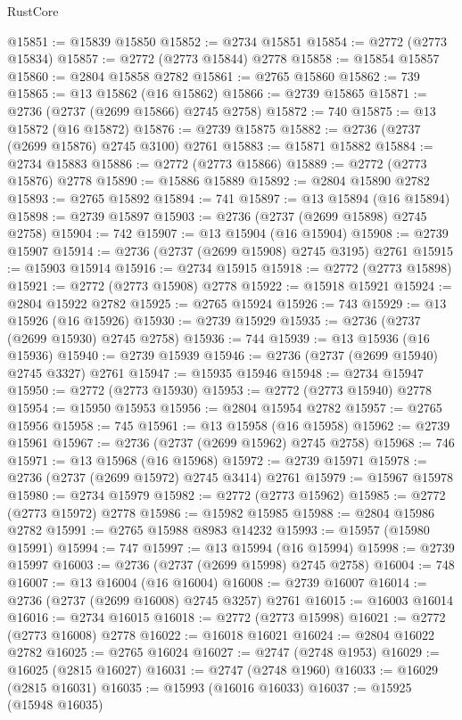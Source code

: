 \begin{lexlean}{RustCore}
\begin{coremodule}
@15851 := @15839 @15850
@15852 := @2734 @15851
@15854 := @2772 (@2773 @15834)
@15857 := @2772 (@2773 @15844) @2778
@15858 := @15854 @15857
@15860 := @2804 @15858 @2782
@15861 := @2765 @15860
@15862 := 739
@15865 := @13 @15862 (@16 @15862)
@15866 := @2739 @15865
@15871 := @2736 (@2737 (@2699 @15866) @2745 @2758)
@15872 := 740
@15875 := @13 @15872 (@16 @15872)
@15876 := @2739 @15875
@15882 := @2736 (@2737 (@2699 @15876) @2745 @3100) @2761
@15883 := @15871 @15882
@15884 := @2734 @15883
@15886 := @2772 (@2773 @15866)
@15889 := @2772 (@2773 @15876) @2778
@15890 := @15886 @15889
@15892 := @2804 @15890 @2782
@15893 := @2765 @15892
@15894 := 741
@15897 := @13 @15894 (@16 @15894)
@15898 := @2739 @15897
@15903 := @2736 (@2737 (@2699 @15898) @2745 @2758)
@15904 := 742
@15907 := @13 @15904 (@16 @15904)
@15908 := @2739 @15907
@15914 := @2736 (@2737 (@2699 @15908) @2745 @3195) @2761
@15915 := @15903 @15914
@15916 := @2734 @15915
@15918 := @2772 (@2773 @15898)
@15921 := @2772 (@2773 @15908) @2778
@15922 := @15918 @15921
@15924 := @2804 @15922 @2782
@15925 := @2765 @15924
@15926 := 743
@15929 := @13 @15926 (@16 @15926)
@15930 := @2739 @15929
@15935 := @2736 (@2737 (@2699 @15930) @2745 @2758)
@15936 := 744
@15939 := @13 @15936 (@16 @15936)
@15940 := @2739 @15939
@15946 := @2736 (@2737 (@2699 @15940) @2745 @3327) @2761
@15947 := @15935 @15946
@15948 := @2734 @15947
@15950 := @2772 (@2773 @15930)
@15953 := @2772 (@2773 @15940) @2778
@15954 := @15950 @15953
@15956 := @2804 @15954 @2782
@15957 := @2765 @15956
@15958 := 745
@15961 := @13 @15958 (@16 @15958)
@15962 := @2739 @15961
@15967 := @2736 (@2737 (@2699 @15962) @2745 @2758)
@15968 := 746
@15971 := @13 @15968 (@16 @15968)
@15972 := @2739 @15971
@15978 := @2736 (@2737 (@2699 @15972) @2745 @3414) @2761
@15979 := @15967 @15978
@15980 := @2734 @15979
@15982 := @2772 (@2773 @15962)
@15985 := @2772 (@2773 @15972) @2778
@15986 := @15982 @15985
@15988 := @2804 @15986 @2782
@15991 := @2765 @15988 @8983 @14232
@15993 := @15957 (@15980 @15991)
@15994 := 747
@15997 := @13 @15994 (@16 @15994)
@15998 := @2739 @15997
@16003 := @2736 (@2737 (@2699 @15998) @2745 @2758)
@16004 := 748
@16007 := @13 @16004 (@16 @16004)
@16008 := @2739 @16007
@16014 := @2736 (@2737 (@2699 @16008) @2745 @3257) @2761
@16015 := @16003 @16014
@16016 := @2734 @16015
@16018 := @2772 (@2773 @15998)
@16021 := @2772 (@2773 @16008) @2778
@16022 := @16018 @16021
@16024 := @2804 @16022 @2782
@16025 := @2765 @16024
@16027 := @2747 (@2748 @1953)
@16029 := @16025 (@2815 @16027)
@16031 := @2747 (@2748 @1960)
@16033 := @16029 (@2815 @16031)
@16035 := @15993 (@16016 @16033)
@16037 := @15925 (@15948 @16035)

\end{coremodule}
\end{lexlean}
